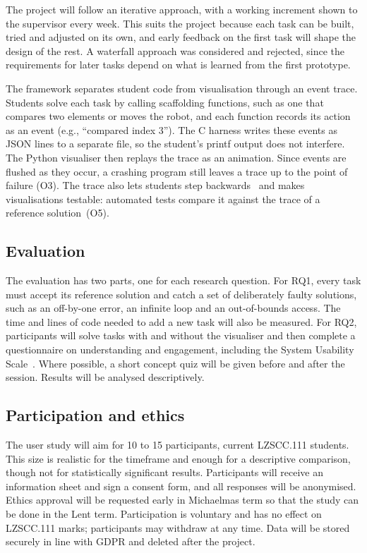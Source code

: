 \documentclass[11pt,a4paper]{article}
\begin{document}
The project will follow an iterative approach, with a working increment shown to the supervisor every week. This suits the project because each task can be built, tried and adjusted on its own, and early feedback on the first task will shape the design of the rest. A waterfall approach was considered and rejected, since the requirements for later tasks depend on what is learned from the first prototype.

The framework separates student code from visualisation through an event trace. Students solve each task by calling scaffolding functions, such as one that compares two elements or moves the robot, and each function records its action as an event (e.g., “compared index 3”). The C harness writes these events as JSON lines to a separate file, so the student’s printf output does not interfere. The Python visualiser then replays the trace as an animation. Since events are flushed as they occur, a crashing program still leaves a trace up to the point of failure (O3). The trace also lets students step backwards~\cite{guo2013pythontutor} and makes visualisations testable: automated tests compare it against the trace of a reference solution~\cite{ihantola2010review}(O5).

\subsection{Evaluation}\label{sec:evaluation}

The evaluation has two parts, one for each research question. For RQ1, every
task must accept its reference solution and catch a set of deliberately faulty solutions, such as an
off-by-one error, an infinite loop and an out-of-bounds access. The time and lines of code needed
to add a new task will also be measured. For RQ2, participants will solve tasks with and without
the visualiser and then complete a questionnaire on understanding and engagement, including
the System Usability Scale~\cite{brooke1996sus}. Where possible, a short concept quiz will be given before and after the session. Results will be analysed descriptively.

\subsection{Participation and ethics}\label{sec:ethics}

The user study will aim for 10 to 15 participants, current LZSCC.111 students. This size is realistic for the timeframe and enough for a descriptive comparison, though not for statistically significant results.
Participants will receive an information sheet and sign a consent form, and all responses will be anonymised. Ethics approval will be requested early in Michaelmas term so that the study can be done in the Lent term. Participation is voluntary and has no effect on LZSCC.111 marks; participants may withdraw at any time. Data will be stored securely in line with GDPR and deleted after the project.
\end{document}
